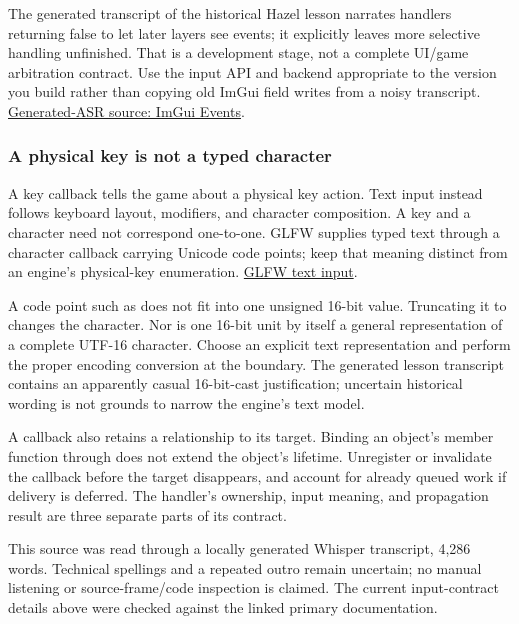 The generated transcript of the historical Hazel lesson narrates handlers returning false to let later layers see events; it explicitly leaves more selective handling unfinished. That is a development stage, not a complete UI/game arbitration contract. Use the input API and backend appropriate to the version you build rather than copying old ImGui field writes from a noisy transcript. \href{https://www.youtube.com/watch?v=yBP1gSbQPPM}{Generated-ASR source: ImGui Events}.

\subsubsection{A physical key is not a typed character}\label{05-engine-i-ch013-a-physical-key-is-not-a-typed-character}

\hypertarget{05-engine-i-ch013-a-physical-key-is-not-a-typed-character}{}

A key callback tells the game about a physical key action. Text input instead follows keyboard layout, modifiers, and character composition. A key and a character need not correspond one-to-one. GLFW supplies typed text through a character callback carrying Unicode code points; keep that meaning distinct from an engine's physical-key enumeration. \href{https://www.glfw.org/docs/latest/input_guide.html\#input_char}{GLFW text input}.

A code point such as  does not fit into one unsigned 16-bit value. Truncating it to  changes the character. Nor is one 16-bit unit by itself a general representation of a complete UTF-16 character. Choose an explicit text representation and perform the proper encoding conversion at the boundary. The generated lesson transcript contains an apparently casual 16-bit-cast justification; uncertain historical wording is not grounds to narrow the engine's text model.

A callback also retains a relationship to its target. Binding an object's member function through  does not extend the object's lifetime. Unregister or invalidate the callback before the target disappears, and account for already queued work if delivery is deferred. The handler's ownership, input meaning, and propagation result are three separate parts of its contract.

This source was read through a locally generated Whisper  transcript, 4,286 words. Technical spellings and a repeated outro remain uncertain; no manual listening or source-frame/code inspection is claimed. The current input-contract details above were checked against the linked primary documentation.

